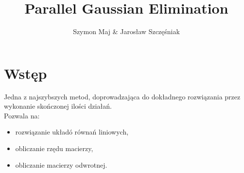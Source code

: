 \documentclass{beamer}
\title{Parallel Gaussian Elimination}
\author{Szymon Maj \& Jarosław Szczęśniak}
\institute{Akademia Górniczo-Hutnicza im. Stanisława Staszica w Krakowie}
\begin{document}
	\begin{frame}
		\titlepage
	\end{frame}

	\section{Wstęp}
	\begin{frame}
		Jedna z najszybszych metod, doprowadzająca do dokładnego rozwiązania przez wykonanie skończonej ilości działań.
		\newline \\
		Pozwala na:
		\begin{itemize}
			\item rozwiązanie układó równań liniowych,
			\item obliczanie rzędu macierzy,
			\item obliczanie macierzy odwrotnej.
		\end{itemize}
	\end{frame}
	
\end{document}
